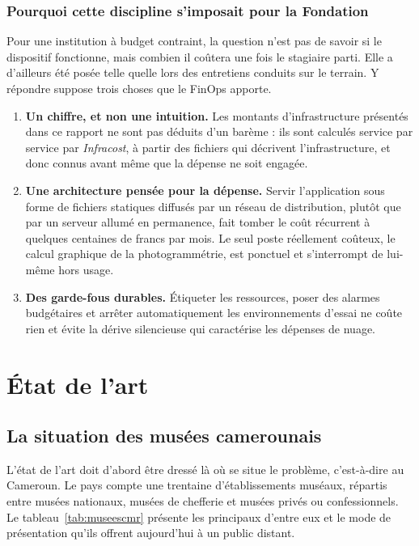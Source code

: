 \subsubsection{Pourquoi cette discipline s'imposait pour la Fondation}

Pour une institution à budget contraint, la question n'est pas de savoir si le
dispositif fonctionne, mais combien il coûtera une fois le stagiaire parti. Elle
a d'ailleurs été posée telle quelle lors des entretiens conduits sur le terrain.
Y répondre suppose trois choses que le FinOps apporte.

\begin{enumerate}
  \item \textbf{Un chiffre, et non une intuition.} Les montants
        d'infrastructure présentés dans ce rapport ne sont pas déduits d'un
        barème : ils sont calculés service par service par \emph{Infracost}, à
        partir des fichiers qui décrivent l'infrastructure, et donc connus avant
        même que la dépense ne soit engagée.

  \item \textbf{Une architecture pensée pour la dépense.} Servir l'application
        sous forme de fichiers statiques diffusés par un réseau de distribution,
        plutôt que par un serveur allumé en permanence, fait tomber le coût
        récurrent à quelques centaines de francs par mois. Le seul poste
        réellement coûteux, le calcul graphique de la photogrammétrie, est
        ponctuel et s'interrompt de lui-même hors usage.

  \item \textbf{Des garde-fous durables.} Étiqueter les ressources, poser des
        alarmes budgétaires et arrêter automatiquement les environnements
        d'essai ne coûte rien et évite la dérive silencieuse qui caractérise les
        dépenses de nuage.
\end{enumerate}

\section{État de l'art}
\label{sec:etatart}

\subsection{La situation des musées camerounais}

L'état de l'art doit d'abord être dressé là où se situe le problème, c'est-à-dire
au Cameroun. Le pays compte une trentaine d'établissements muséaux, répartis
entre musées nationaux, musées de chefferie et musées privés ou confessionnels.
Le tableau~\ref{tab:museescmr} présente les principaux d'entre eux et le mode
de présentation qu'ils offrent aujourd'hui à un public distant.

